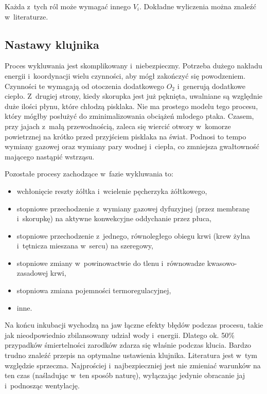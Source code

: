 Każda z~tych ról może wymagać innego $V_i$. Dokładne wyliczenia można znaleźć
w~literaturze.

\subsection{Nastawy klujnika}
Proces wykluwania jest skomplikowany i~niebezpieczny. Potrzeba dużego nakładu
energii i~koordynacji wielu czynności, aby mógł zakończyć się powodzeniem.
Czynności te wymagają od otoczenia dodatkowego $O_2$ i~generują dodatkowe
ciepło.  Z~drugiej strony, kiedy skorupka jest już pęknięta, uwalniane są
względnie duże ilości płynu, które chłodzą pisklaka. Nie ma prostego modelu tego
procesu, który mógłby posłużyć do zminimalizowania obciążeń młodego ptaka.
Czasem, przy jajach z~małą przewodnością, zaleca się wiercić otwory w~komorze
powietrznej na krótko przed przyjściem pisklaka na świat. Podnosi to tempo
wymiany gazowej oraz wymiany pary wodnej i~ciepła, co zmniejsza gwałtowność
mającego nastąpić wstrząsu. 

Pozostałe procesy zachodzące w~fazie wykluwania to:
\begin{itemize}
	\item wchłonięcie reszty żółtka i~wcielenie pęcherzyka żółtkowego,
	\item stopniowe przechodzenie z~wymiany gazowej dyfuzyjnej (przez membranę
		i~skorupkę) na aktywne konwekcyjne oddychanie przez płuca,
	\item stopniowe przechodzenie z~jednego, równoległego obiegu krwi (krew żylna
		i~tętnicza mieszana w~sercu) na szeregowy,
	\item stopniowe zmiany w~powinowactwie do tlenu i~równowadze kwasowo-zasadowej
		krwi,
	\item stopniowa zmiana pojemności termoregulacyjnej,
	\item inne.
\end{itemize}

Na końcu inkubacji wychodzą na jaw łączne efekty błędów podczas procesu, takie
jak nieodpowiednio zbilansowany udział wody i~energii. Dlatego ok. 50\%
przypadków śmiertelności zarodków zdarza się właśnie podczas klucia. Bardzo
trudno znaleźć przepis na optymalne ustawienia klujnika.  Literatura jest w~tym
względzie sprzeczna. Najprościej i~najbezpieczniej jest nie zmieniać warunków na
ten czas (naśladując w~ten sposób naturę), wyłączając jedynie obracanie jaj
i~podnosząc wentylację. 


